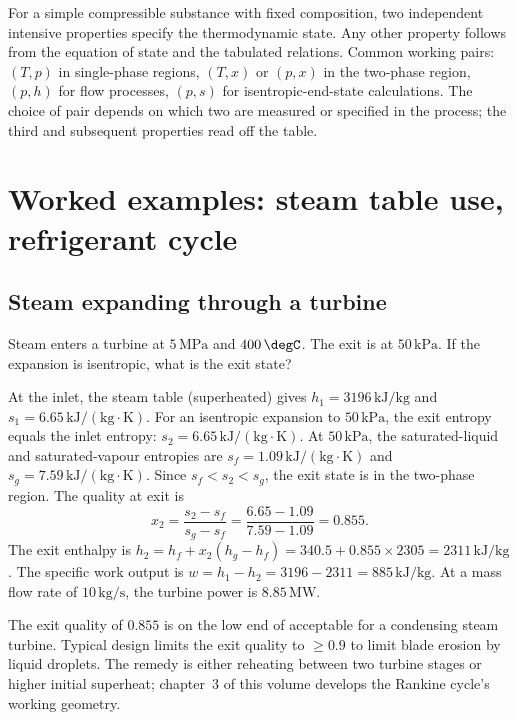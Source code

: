 \begin{principle}
For a simple compressible substance with fixed composition, two
independent intensive properties specify the thermodynamic state. Any
other property follows from the equation of state and the tabulated
relations. Common working pairs: $(T, p)$ in single-phase regions,
$(T, x)$ or $(p, x)$ in the two-phase region, $(p, h)$ for flow
processes, $(p, s)$ for isentropic-end-state calculations. The choice
of pair depends on which two are measured or specified in the
process; the third and subsequent properties read off the table.
\end{principle}

\section{Worked examples: steam table use, refrigerant cycle}

\subsection{Steam expanding through a turbine}

Steam enters a turbine at $5\,\text{MPa}$ and $400\,\degC$. The
exit is at $50\,\text{kPa}$. If the expansion is isentropic, what is
the exit state?

At the inlet, the steam table (superheated) gives $h_1 = 3196\,
\text{kJ}/\text{kg}$ and $s_1 = 6.65\,\text{kJ}/(\text{kg}\cdot
\si{\kelvin})$. For an isentropic expansion to $50\,\text{kPa}$, the
exit entropy equals the inlet entropy: $s_2 = 6.65\,\text{kJ}/(\text{kg}
\cdot\si{\kelvin})$. At $50\,\text{kPa}$, the saturated-liquid and
saturated-vapour entropies are $s_f = 1.09\,\text{kJ}/(\text{kg}\cdot
\si{\kelvin})$ and $s_g = 7.59\,\text{kJ}/(\text{kg}\cdot\si{\kelvin})$.
Since $s_f < s_2 < s_g$, the exit state is in the two-phase region.
The quality at exit is
\[
x_2 = \frac{s_2 - s_f}{s_g - s_f} = \frac{6.65 - 1.09}{7.59 - 1.09} =
0.855.
\]
The exit enthalpy is $h_2 = h_f + x_2 (h_g - h_f) = 340.5 + 0.855
\times 2305 = 2311\,\text{kJ}/\text{kg}$. The specific work output is
$w = h_1 - h_2 = 3196 - 2311 = 885\,\text{kJ}/\text{kg}$. At a mass
flow rate of $10\,\text{kg}/\text{s}$, the turbine power is $8.85\,
\text{MW}$.

The exit quality of $0.855$ is on the low end of acceptable for a
condensing steam turbine. Typical design limits the exit quality to
$\geq 0.9$ to limit blade erosion by liquid droplets. The remedy is
either reheating between two turbine stages or higher initial
superheat; chapter~3 of this volume develops the Rankine cycle's
working geometry.

